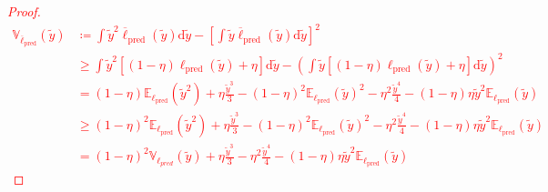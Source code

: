 \documentclass[12pt, english, oneside, a4paper]{article}
\begin{document}
\textcolor{red}{
\begin{proof}
    \begin{align*}
        \mathbb{V}_{\overline{\ell}_\text{pred}}(\tilde{y}) &\coloneqq \int \tilde{y}^2 \overline{\ell}_\text{pred}(\tilde{y}) \text{d}\tilde{y} - \left[\int \tilde{y} \overline{\ell}_\text{pred}(\tilde{y}) \text{d}\tilde{y}\right]^2\\
        &\geq \int \tilde{y}^2 \left[ (1-\eta) {\ell}_\text{pred}(\tilde{y}) +\eta \right] \text{d}\tilde{y} - \left(\int \tilde{y} \left[(1-\eta) {\ell}_\text{pred}(\tilde{y}) + \eta \right] \text{d}\tilde{y}\right)^2\\
        &= (1-\eta) \mathbb{E}_{\ell_\text{pred}}(\tilde{y}^2) + \eta \frac{\tilde y ^3}{3} - (1-\eta)^2 \mathbb{E}_{\ell_\text{pred}}(\tilde{y})^2 -\eta^2 \frac{\tilde y ^4}{4} - (1-\eta) \eta \tilde{y}^2 \mathbb{E}_{\ell_\text{pred}}(\tilde{y})\\
        &\geq (1-\eta)^2 \mathbb{E}_{\ell_\text{pred}}(\tilde{y}^2) + \eta \frac{\tilde y ^3}{3} - (1-\eta)^2 \mathbb{E}_{\ell_\text{pred}}(\tilde{y})^2 -\eta^2 \frac{\tilde y ^4}{4} - (1-\eta) \eta \tilde{y}^2 \mathbb{E}_{\ell_\text{pred}}(\tilde{y})\\
        &= (1-\eta)^2\mathbb{V}_{\ell_{pred}}(\tilde{y})+ \eta \frac{\tilde y ^3}{3} -\eta^2 \frac{\tilde y ^4}{4} - (1-\eta) \eta \tilde{y}^2 \mathbb{E}_{\ell_\text{pred}}(\tilde{y}) 
    \end{align*}
\end{proof}
}



\fi 



   
\end{document}
